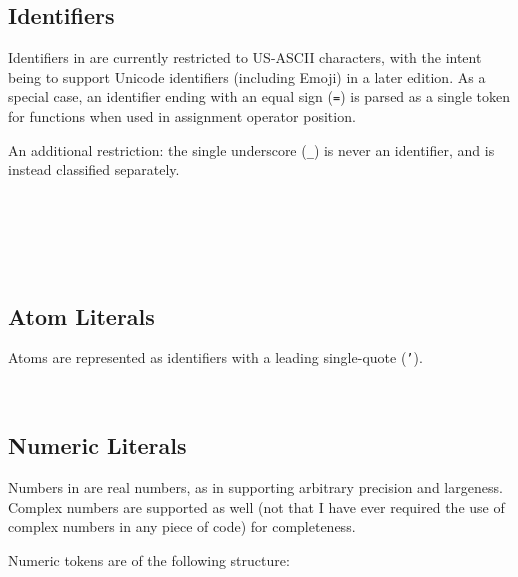 \FloatBarrier
\subsection{Identifiers}

Identifiers in \Trilogy{} are currently restricted to US-ASCII characters,
with the intent being to support Unicode identifiers (including Emoji) in
a later edition. As a special case, an identifier ending with an equal
sign (\texttt{=}) is parsed as a single token for functions when used
in assignment operator position.

An additional restriction: the single underscore (\texttt{\_}) is never an
identifier, and is instead classified separately.

\begin{bnf*}
    \\
    \\
    \\
     \\
\end{bnf*}

\subsection{Atom Literals}

Atoms are represented as identifiers with a leading single-quote (\texttt{'}).

\begin{bnf*}
     \\
\end{bnf*}

\subsection{Numeric Literals}

Numbers in \Trilogy{} are real numbers, as in supporting arbitrary
precision and largeness. Complex numbers are supported as well
(not that I have ever required the use of complex numbers in any
piece of code) for completeness.

Numeric tokens are of the following structure:

